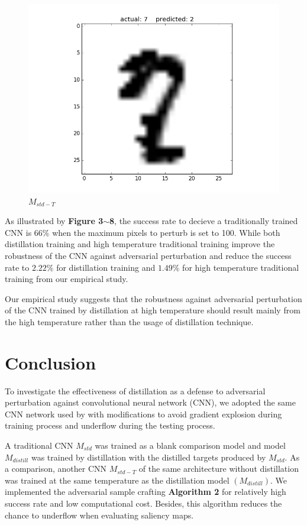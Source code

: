 \documentclass{article}
\begin{document}
\begin{figure}[h!]
\begin{minipage}{0.5\textwidth}
		\includegraphics[width=\textwidth]{T.png}
		\caption{$M_{std-T}$}
	\end{minipage} \hfill
\end{figure}

As illustrated by \textbf{Figure 3$\sim$8}, the success rate to decieve a traditionally trained CNN is $66\%$ when the maximum pixels to perturb is set to 100.
While both distillation training and high temperature traditional training improve the robustness of the CNN against adversarial perturbation and reduce the success rate to $2.22\%$ for distillation training and $1.49\%$ for high temperature traditional training from our empirical study.

Our empirical study suggests that the robustness against adversarial perturbation of the CNN trained by distillation at high temperature should result mainly from the high temperature rather than the usage of distillation technique.

\section{Conclusion}

To investigate the effectiveness of distillation as a defense to adversarial perturbation against convolutional neural network (CNN), we adopted the same CNN network used by \cite{Papernot} with modifications to avoid gradient explosion during training process and underflow during the testing process.

A traditional CNN $M_{std}$ was trained as a blank comparison model and model $M_{distill}$ was trained by distillation with the distilled targets produced by $M_{std}$.
As a comparison, another CNN $M_{std-T}$ of the same architecture without distillation was trained at the same temperature as the distillation model $(M_{distill})$.
We implemented the adversarial sample crafting \textbf{Algorithm 2} for relatively high success rate and low computational cost. Besides, this algorithm reduces the chance to underflow when evaluating saliency maps.
\end{document}
